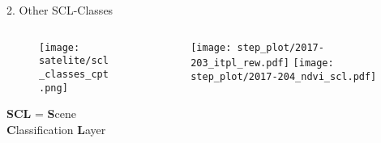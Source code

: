 \begin{frame}[t]{2. Other SCL-Classes}
    \begin{columns}
        \begin{column}{0.45\textwidth}
            \vspace{-1cm}
            \begin{figure}
                \texttt{[image: satelite/scl\_classes\_cpt.png]}
            \end{figure}
            \textbf{SCL} = \textbf{S}cene \textbf{C}lassification \textbf{L}ayer
        \end{column}
        \begin{column}{0.42\textwidth}
            \begin{figure}
                \vspace{-1.8cm}
                \texttt{[image: step\_plot/2017-203\_itpl\_rew.pdf]}
                \texttt{[image: step\_plot/2017-204\_ndvi\_scl.pdf]}
            \end{figure}
        \end{column}
    \end{columns}
\end{frame}

